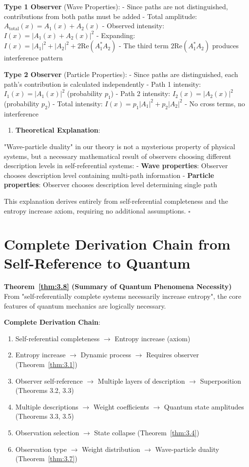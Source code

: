    \textbf{Type 1 Observer} (Wave Properties):
   - Since paths are not distinguished, contributions from both paths must be added
   - Total amplitude: $A_{\text{total}}(x) = A_1(x) + A_2(x)$
   - Observed intensity: $I(x) = |A_1(x) + A_2(x)|^2$
   - Expanding: $I(x) = |A_1|^2 + |A_2|^2 + 2\text{Re}(A_1^*A_2)$
   - The third term $2\text{Re}(A_1^*A_2)$ produces interference pattern
   
   \textbf{Type 2 Observer} (Particle Properties):
   - Since paths are distinguished, each path's contribution is calculated independently
   - Path 1 intensity: $I_1(x) = |A_1(x)|^2$ (probability $p_1$)
   - Path 2 intensity: $I_2(x) = |A_2(x)|^2$ (probability $p_2$)
   - Total intensity: $I(x) = p_1|A_1|^2 + p_2|A_2|^2$
   - No cross terms, no interference

\begin{enumerate}
\item \textbf{Theoretical Explanation}:
\end{enumerate}
   
   "Wave-particle duality" in our theory is not a mysterious property of physical systems, but a necessary mathematical result of observers choosing different description levels in self-referential systems:
   - \textbf{Wave properties}: Observer chooses description level containing multi-path information
   - \textbf{Particle properties}: Observer chooses description level determining single path
   
   This explanation derives entirely from self-referential completeness and the entropy increase axiom, requiring no additional assumptions. $\square$

\section{Complete Derivation Chain from Self-Reference to Quantum}
\label{sec:ch05_quantum:complete-derivation-chain-from-self-reference-to-quantum}

\textbf{Theorem~\ref{thm:3.8} (Summary of Quantum Phenomena Necessity)}
\label{thm:3.8}
From "self-referentially complete systems necessarily increase entropy", the core features of quantum mechanics are logically necessary.

\textbf{Complete Derivation Chain}:
\begin{enumerate}
\item Self-referential completeness $\rightarrow$ Entropy increase (axiom)
\item Entropy increase $\rightarrow$ Dynamic process $\rightarrow$ Requires observer (Theorem~\ref{thm:3.1})
\item Observer self-reference $\rightarrow$ Multiple layers of description $\rightarrow$ Superposition (Theorems 3.2, 3.3)
\item Multiple descriptions $\rightarrow$ Weight coefficients $\rightarrow$ Quantum state amplitudes (Theorems 3.3, 3.5)
\item Observation selection $\rightarrow$ State collapse (Theorem~\ref{thm:3.4})
\item Observation type $\rightarrow$ Weight distribution $\rightarrow$ Wave-particle duality (Theorem~\ref{thm:3.7})
\end{enumerate}

